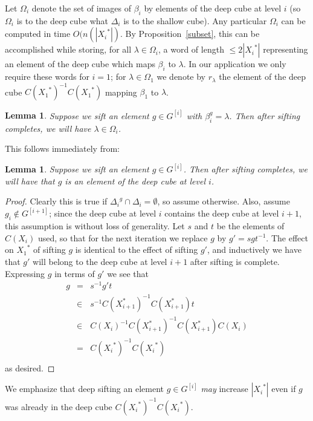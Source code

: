 \documentclass[12pt]{article}
\newtheorem{lemma}[theorem]{Lemma}
\begin{document}
Let $\Omega_i$ denote the set of images of $\beta_{i}$
by elements of the deep cube at level $i$ (so $\Omega_i$ is to the
deep cube what $\Delta_i$ is to the shallow cube). Any particular
$\Omega_i$ can be computed in time $O(n(|{X_i}^*|)$.
By Proposition~\ref{subset}, 
this can be accomplished while storing, for all $\lambda\in\Omega_i$,
a word of length $\leq 2|{X_i}^*|$
representing an element of the deep cube which maps $\beta_i$ to $\lambda$.
In our application we only require these words for $i=1$;
for $\lambda\in\Omega_1$ we denote by $r_\lambda$ the element of the
deep cube $C({X_1}^*)^{-1}C({X_1}^*)$ mapping $\beta_1$ to $\lambda$.
\begin{lemma}\label{augment-transversal}
  Suppose we sift an element $g\in G^{[i]}$ with $\beta_{i}^g=\lambda$.
  Then after sifting completes,
  we will have $\lambda\in\Omega_i$.
\end{lemma}
This follows immediately from:
\begin{lemma}\label{augment-generators}
  Suppose we sift an element $g\in G^{[i]}$. Then after sifting completes,
  we will have that $g$ is an element of the deep cube
  at level $i$.
\end{lemma}
\begin{proof}
  Clearly this is true if
  ${\Delta_i}^{g}\cap\Delta_i=\emptyset$, so assume otherwise.
  Also, assume $g_i\not\in G^{[i+1]}$; since
  the deep cube at level $i$ contains the deep cube at
  level $i+1$, this assumption is without loss of generality.
  Let $s$ and $t$ be the elements of $C(X_i)$ used,
  so that for the next iteration we replace $g$ by
  $g'=sgt^{-1}$.  The effect on ${X_1}^*$ of
  sifting $g$ is identical to the effect of
  sifting $g'$, and 
  inductively we have that
  $g'$ will belong to the deep cube at level $i+1$ after
  sifting is complete.  Expressing $g$ in terms of $g'$
  we see that
  \begin{eqnarray*}
    g&=&s^{-1}g't\\
    &\in& s^{-1} C(X_{i+1}^*)^{-1}C(X_{i+1}^*) t\\
    &\in& C(X_i)^{-1} C(X_{i+1}^*)^{-1}C(X_{i+1}^*) C(X_i)\\
    &=& C({X_i}^*)^{-1}C({X_i}^*)\\
  \end{eqnarray*}
  as desired.
\end{proof}
We emphasize that
deep sifting an element $g\in G^{[i]}$ {\em may}\/
increase $|{X_i}^*|$ even if $g$ was already in the deep cube 
$C({X_i}^*)^{-1}C({X_i}^*)$.  
\end{document}
